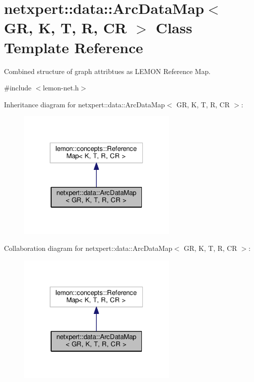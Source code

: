 \hypertarget{classnetxpert_1_1data_1_1ArcDataMap}{}\section{netxpert\+:\+:data\+:\+:Arc\+Data\+Map$<$ GR, K, T, R, CR $>$ Class Template Reference}
\label{classnetxpert_1_1data_1_1ArcDataMap}


Combined structure of graph attribtues as L\+E\+M\+ON Reference Map.  




{\ttfamily \#include $<$lemon-\/net.\+h$>$}



Inheritance diagram for netxpert\+:\+:data\+:\+:Arc\+Data\+Map$<$ GR, K, T, R, CR $>$\+:\nopagebreak
\begin{figure}[H]
\begin{center}
\leavevmode
\includegraphics[width=220pt]{classnetxpert_1_1data_1_1ArcDataMap__inherit__graph}
\end{center}
\end{figure}


Collaboration diagram for netxpert\+:\+:data\+:\+:Arc\+Data\+Map$<$ GR, K, T, R, CR $>$\+:\nopagebreak
\begin{figure}[H]
\begin{center}
\leavevmode
\includegraphics[width=220pt]{classnetxpert_1_1data_1_1ArcDataMap__coll__graph}
\end{center}
\end{figure}
